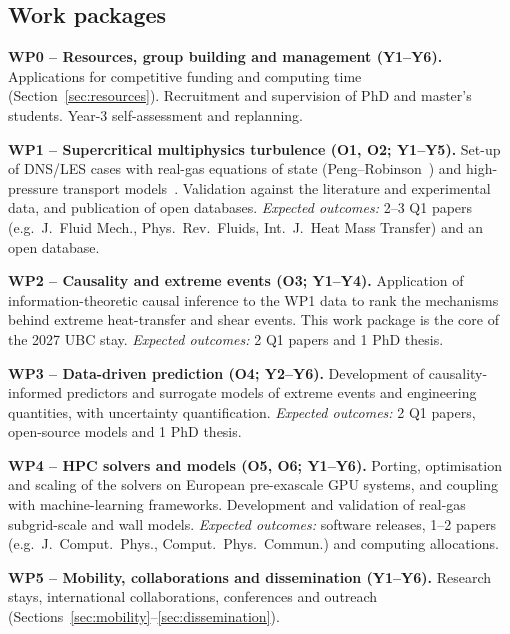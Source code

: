 \documentclass[11pt]{article}
\begin{document}
\subsection{Work packages}
\textbf{WP0 -- Resources, group building and management (Y1--Y6).}
Applications for competitive funding and computing time
(Section~\ref{sec:resources}). Recruitment and supervision of PhD and master's students.
Year-3 self-assessment and replanning.

\textbf{WP1 -- Supercritical multiphysics turbulence (O1, O2; Y1--Y5).}
Set-up of DNS/LES cases with real-gas equations of state (Peng--Robinson~\cite{PengRobinson1976}) and
high-pressure transport models~\cite{Chung1988}. Validation against the literature and experimental data, and
publication of open databases. \emph{Expected outcomes:} 2--3 Q1 papers (e.g.\ J.\ Fluid
Mech., Phys.\ Rev.\ Fluids, Int.\ J.\ Heat Mass Transfer) and an open database.

\textbf{WP2 -- Causality and extreme events (O3; Y1--Y4).}
Application of information-theoretic causal inference to the WP1 data to rank the
mechanisms behind extreme heat-transfer and shear events. This work package is the core of
the 2027 UBC stay.
\emph{Expected outcomes:} 2 Q1 papers and 1 PhD thesis.

\textbf{WP3 -- Data-driven prediction (O4; Y2--Y6).}
Development of causality-informed predictors and surrogate models of extreme events and
engineering quantities, with uncertainty quantification.
\emph{Expected outcomes:} 2 Q1 papers, open-source models and 1 PhD thesis.

\textbf{WP4 -- HPC solvers and models (O5, O6; Y1--Y6).}
Porting, optimisation and scaling of the solvers on European pre-exascale GPU systems, and
coupling with machine-learning frameworks. Development and validation of real-gas
subgrid-scale and wall models.
\emph{Expected outcomes:} software releases, 1--2 papers (e.g.\ J.\ Comput.\
Phys., Comput.\ Phys.\ Commun.) and computing allocations.

\textbf{WP5 -- Mobility, collaborations and dissemination (Y1--Y6).}
Research stays, international collaborations, conferences and outreach
(Sections~\ref{sec:mobility}--\ref{sec:dissemination}).
\end{document}
